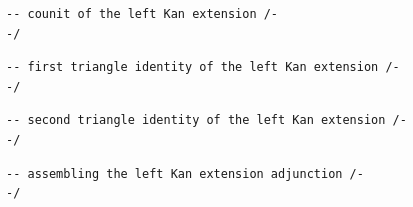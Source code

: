 \documentclass{book}
\theoremstyle{definition}
\newcounter{lcounter}
\begin{document}
\begin{center} \begin{tcolorbox}[width=5in,colback={white},title={\begin{center}\texttt{Lean \thelcounter} \addtocounter{lcounter}{1} \end{center}},colbacktitle=Blue,coltitle=black] \begin{verbatim}
-- counit of the left Kan extension /-
-/
\end{verbatim} \end{tcolorbox} \end{center}
\begin{center} \begin{tcolorbox}[width=5in,colback={white},title={\begin{center}\texttt{Lean \thelcounter} \addtocounter{lcounter}{1} \end{center}},colbacktitle=Blue,coltitle=black] \begin{verbatim}
-- first triangle identity of the left Kan extension /-
-/
\end{verbatim} \end{tcolorbox} \end{center}

\begin{center} \begin{tcolorbox}[width=5in,colback={white},title={\begin{center}\texttt{Lean \thelcounter} \addtocounter{lcounter}{1} \end{center}},colbacktitle=Blue,coltitle=black] \begin{verbatim}
-- second triangle identity of the left Kan extension /-
-/
\end{verbatim} \end{tcolorbox} \end{center}
\begin{center} \begin{tcolorbox}[width=5in,colback={white},title={\begin{center}\texttt{Lean \thelcounter} \addtocounter{lcounter}{1} \end{center}},colbacktitle=Blue,coltitle=black] \begin{verbatim}
-- assembling the left Kan extension adjunction /-
-/
\end{verbatim} \end{tcolorbox} \end{center}
\end{document}
